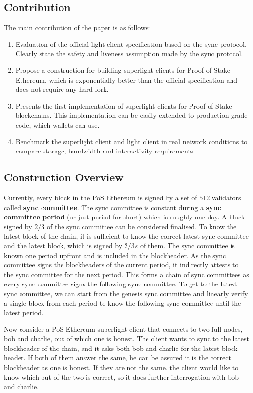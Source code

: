 \documentclass[a4paper,11pt,oneside]{article}
\theoremstyle{definition}
\begin{document}
  \subsection{Contribution}
  The main contribution of the paper is as follows:
  \begin{enumerate}
      \item Evaluation of the official light client specification based on the sync protocol. Clearly state the safety and liveness assumption made by the sync protocol. 
      \item Propose a construction for building superlight clients for Proof of Stake Ethereum, which is exponentially better than the official specification and does not require any hard-fork.
      \item Presents the first implementation of superlight clients for Proof of Stake blockchains. This implementation can be easily extended to production-grade code, which wallets can use. 
      \item Benchmark the superlight client and light client in real network conditions to compare storage, bandwidth and interactivity requirements.  
  \end{enumerate}
      
  
  \subsection{Construction Overview}
  Currently, every block in the PoS Ethereum is signed by a set of 512 validators called \textbf{sync committee}. The sync committee is constant during a \textbf{sync committee period} (or just period for short) which is roughly one day. A block signed by $2/3$ of the sync committee can be considered finalised. To know the latest block of the chain, it is sufficient to know the correct latest sync committee and the latest block, which is signed by $2/3s$ of them. The sync committee is known one period upfront and is included in the blockheader. As the sync committee signs the blockheaders of the current period, it indirectly attests to the sync committee for the next period. This forms a chain of sync committees as every sync committee signs the following sync committee. To get to the latest sync committee, we can start from the genesis sync committee and linearly verify a single block from each period to know the following sync committee until the latest period. 
  
  Now consider a PoS Ethereum superlight client that connects to two full nodes, bob and charlie, out of which one is honest. The client wants to sync to the latest blockheader of the chain, and it asks both bob and charlie for the latest block header. If both of them answer the same, he can be assured it is the correct blockheader as one is honest. If they are not the same, the client would like to know which out of the two is correct, so it does further interrogation with bob and charlie. 
  
\end{document}
